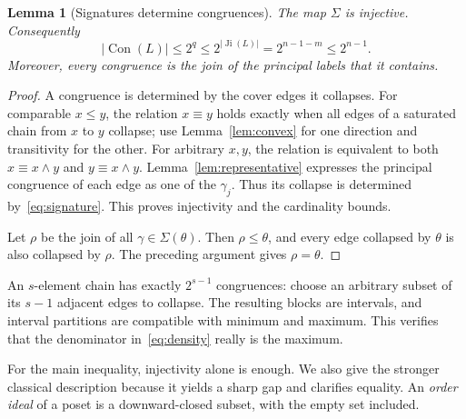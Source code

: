 \documentclass[11pt,a4paper]{article}
\numberwithin{equation}{section}
\newtheorem{lemma}[theorem]{Lemma}
\theoremstyle{definition}
\theoremstyle{remark}
\DeclareMathOperator{\Con}{Con}
\DeclareMathOperator{\Ji}{Ji}
\newcommand{\card}[1]{\lvert #1\rvert}
\begin{document}
\begin{lemma}[Signatures determine congruences]\label{lem:signature}
The map $\Sigma$ is injective. Consequently
\begin{equation}\label{eq:classical}
 \card{\Con(L)}\le2^q\le2^{\card{\Ji(L)}}
   =2^{n-1-m}\le2^{n-1}.
\end{equation}
Moreover, every congruence is the join of the principal labels that it contains.
\end{lemma}
\begin{proof}
A congruence is determined by the cover edges it collapses.
For comparable $x\le y$, the relation $x\equiv y$ holds exactly when all edges
of a saturated chain from $x$ to $y$ collapse; use
Lemma~\ref{lem:convex} for one direction and transitivity for the other.
For arbitrary $x,y$, the relation is equivalent to both
$x\equiv x\wedge y$ and $y\equiv x\wedge y$.
Lemma~\ref{lem:representative} expresses the principal congruence of each edge
as one of the $\gamma_j$. Thus its collapse is determined by~\eqref{eq:signature}.
This proves injectivity and the cardinality bounds.

Let $\rho$ be the join of all $\gamma\in\Sigma(\theta)$.
Then $\rho\le\theta$, and every edge collapsed by $\theta$ is also collapsed by
$\rho$. The preceding argument gives $\rho=\theta$.
\end{proof}

An $s$-element chain has exactly $2^{s-1}$ congruences: choose an arbitrary subset
of its $s-1$ adjacent edges to collapse. The resulting blocks are intervals,
and interval partitions are compatible with minimum and maximum.
This verifies that the denominator in~\eqref{eq:density} really is the maximum.

For the main inequality, injectivity alone is enough. We also give the stronger
classical description because it yields a sharp gap and clarifies equality.
An \emph{order ideal} of a poset is a downward-closed subset, with the empty set
included.
\end{document}

